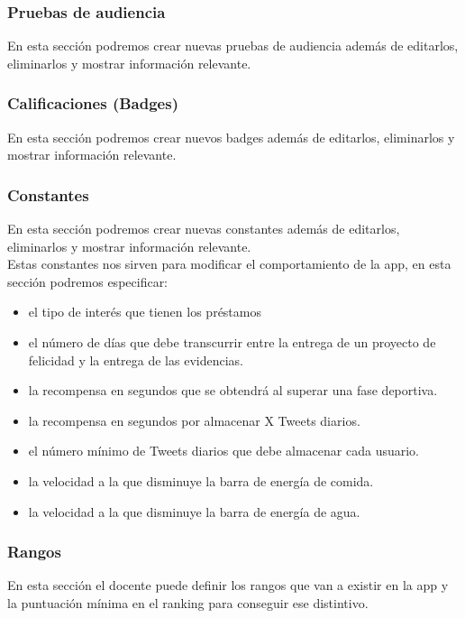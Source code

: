 \subsubsection{Pruebas de audiencia}
En esta sección podremos crear nuevas pruebas de audiencia además de editarlos, eliminarlos y mostrar información relevante.\\

\subsubsection{Calificaciones (Badges)}
En esta sección podremos crear nuevos badges además de editarlos, eliminarlos y mostrar información relevante.\\

\subsubsection{Constantes}
En esta sección podremos crear nuevas constantes además de editarlos, eliminarlos y mostrar información relevante.\\

Estas constantes nos sirven para modificar el comportamiento de la app, en esta sección podremos especificar: 

\begin{itemize}
	\item el tipo de interés que tienen los préstamos
	\item el número de días que debe transcurrir entre la entrega de un proyecto de felicidad y la entrega de las evidencias.
	\item la recompensa en segundos que se obtendrá al superar una fase deportiva.
	\item la recompensa en segundos por almacenar X Tweets diarios.
	\item el número mínimo de Tweets diarios que debe almacenar cada usuario.
	\item la velocidad a la que disminuye la barra de energía de comida.
	\item la velocidad a la que disminuye la barra de energía de agua.
\end{itemize}

\subsubsection{Rangos}
En esta sección el docente puede definir los rangos que van a existir en la app y la puntuación mínima en el ranking para conseguir ese distintivo.

